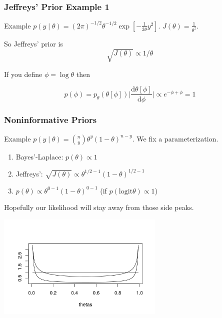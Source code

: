 \documentclass{beamer}
\begin{document}

\begin{frame}[fragile]
\frametitle{Jeffreys' Prior Example 1}

Example $p(y \mid \theta) = (2\pi)^{-1/2}  \theta^{-1/2} \exp\left[-\frac{1}{2\theta}y^2 \right]$. $J(\theta) = \frac{1}{\theta^2}$. 
\newline

So Jeffreys' prior is 
\[
\sqrt{J(\theta)} \propto 1/\theta
\]

If you define $\phi = \log \theta $ then

\[
p(\phi) = p_{\theta}( \theta[\phi]) \bigg\rvert \frac{\text{d} \theta[\phi]}{ \text{d} \phi} \bigg\rvert \propto e^{-\phi + \phi} = 1
\]

\end{frame}


\begin{frame}[fragile]
\frametitle{Noninformative Priors}

Example $p(y \mid \theta) = \binom{n}{y} \theta^y (1-\theta)^{n-y}$. We fix a parameterization. 
\newline

\begin{enumerate}
\item Bayes'-Laplace: $p(\theta) \propto 1$
\item Jeffreys': $\sqrt{J(\theta)} \propto \theta^{1/2-1}(1-\theta)^{1/2-1}$
\item $p(\theta) \propto \theta^{0-1}(1-\theta)^{0-1}$ (if $p(\text{logit} \theta) \propto 1$)
\end{enumerate}

Hopefully our likelihood will stay away from those side peaks.


\begin{center}
\includegraphics[width=80mm]{pics/Rplot2.png}
\end{center}


\end{frame}
\end{document}
